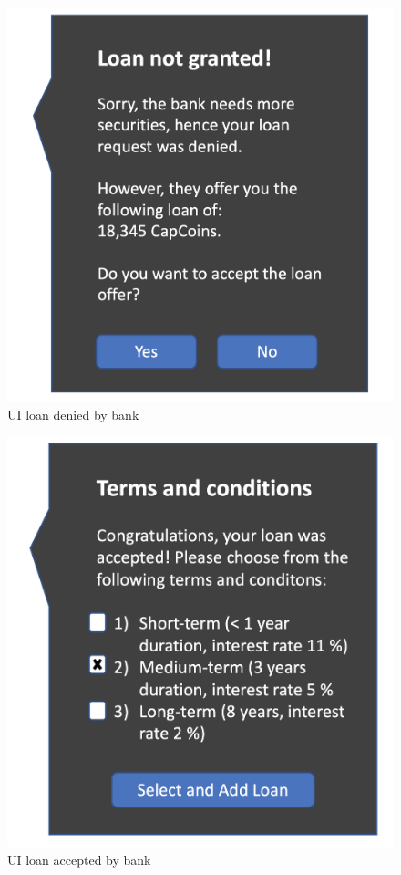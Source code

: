 \begin{figure}
    \includegraphics [scale=0.3]{images/loanDenied.png}
    \caption{UI loan denied by bank}
    \label{fig:loan_denied}
\end{figure}

\begin{figure}
    \includegraphics[scale=0.3]{images/loanAccepted.png}
    \caption{UI loan accepted by bank}
    \label{fig:loanAccepted}
\end{figure}

